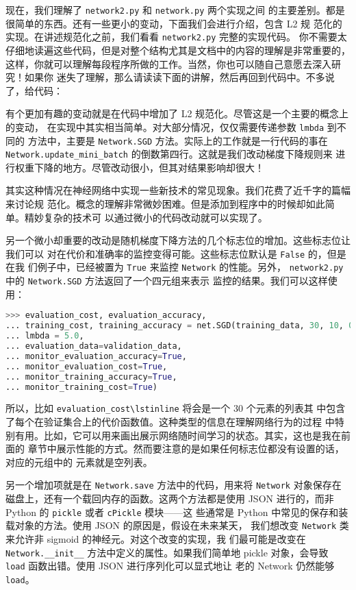 现在，我们理解了 \lstinline!network2.py! 和 \lstinline!network.py! 两个实现之间
的主要差别。都是很简单的东西。还有一些更小的变动，下面我们会进行介绍，包含 L2 规
范化的实现。在讲述规范化之前，我们看看 \lstinline!network2.py! 完整的实现代码。
你不需要太仔细地读遍这些代码，但是对整个结构尤其是文档中的内容的理解是非常重要的，
这样，你就可以理解每段程序所做的工作。当然，你也可以随自己意愿去深入研究！如果你
迷失了理解，那么请读读下面的讲解，然后再回到代码中。不多说了，给代码：



有个更加有趣的变动就是在代码中增加了 L2 规范化。尽管这是一个主要的概念上的变动，
在实现中其实相当简单。对大部分情况，仅仅需要传递参数 \lstinline!lmbda! 到不同的
方法中，主要是 \lstinline!Network.SGD! 方法。实际上的工作就是一行代码的事在
\lstinline!Network.update_mini_batch! 的倒数第四行。这就是我们改动梯度下降规则来
进行权重下降的地方。尽管改动很小，但其对结果影响却很大！

其实这种情况在神经网络中实现一些新技术的常见现象。我们花费了近千字的篇幅来讨论规
范化。概念的理解非常微妙困难。但是添加到程序中的时候却如此简单。精妙复杂的技术可
以通过微小的代码改动就可以实现了。

另一个微小却重要的改动是随机梯度下降方法的几个标志位的增加。这些标志位让我们可以
对在代价和准确率的监控变得可能。这些标志位默认是 \lstinline!False! 的，但是在我
们例子中，已经被置为 \lstinline!True! 来监控 \lstinline!Network! 的性能。另外，
\lstinline!network2.py! 中的 \lstinline!Network.SGD! 方法返回了一个四元组来表示
监控的结果。我们可以这样使用：
\begin{lstlisting}[language=Python]
>>> evaluation_cost, evaluation_accuracy, 
... training_cost, training_accuracy = net.SGD(training_data, 30, 10, 0.5,
... lmbda = 5.0,
... evaluation_data=validation_data,
... monitor_evaluation_accuracy=True,
... monitor_evaluation_cost=True,
... monitor_training_accuracy=True,
... monitor_training_cost=True)
\end{lstlisting}

所以，比如 \lstinline!evaluation_cost\lstinline! 将会是一个 $30$ 个元素的列表其
中包含了每个\epoch{}在验证集合上的代价函数值。这种类型的信息在理解网络行为的过程
中特别有用。比如，它可以用来画出展示网络随时间学习的状态。其实，这也是我在前面的
章节中展示性能的方式。然而要注意的是如果任何标志位都没有设置的话，对应的元组中的
元素就是空列表。

另一个增加项就是在 \lstinline!Network.save! 方法中的代码，用来将
\lstinline!Network! 对象保存在磁盘上，还有一个载回内存的函数。这两个方法都是使用
JSON 进行的，而非 Python 的 \lstinline!pickle! 或者 \lstinline!cPickle! 模块——这
些通常是 Python 中常见的保存和装载对象的方法。使用 JSON 的原因是，假设在未来某天，
我们想改变 \lstinline!Network! 类来允许非 sigmoid 的神经元。对这个改变的实现，我
们最可能是改变在 \lstinline!Network.__init__! 方法中定义的属性。如果我们简单地
pickle 对象，会导致 \lstinline!load! 函数出错。使用 JSON 进行序列化可以显式地让
老的 Network 仍然能够 \lstinline!load!。

